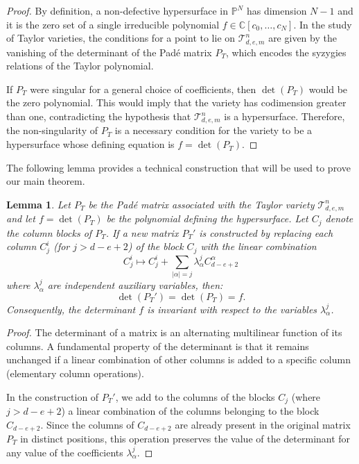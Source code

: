 \documentclass[letterpaper,11pt]{amsart}
\theoremstyle{plain}
\newtheorem{lemma}[theorem]{Lemma}
\theoremstyle{definition}
\begin{document}
\begin{proof}
By definition, a non-defective hypersurface in $\mathbb{P}^N$ has dimension $N-1$ and it is the zero set of a single irreducible polynomial $f \in \mathbb{C}[c_0, \dots, c_N]$. In the study of Taylor varieties, the conditions for a point to lie on $\mathcal{T}^{n}_{d,e,m}$ are given by the vanishing of the determinant of the Padé matrix $P_T$, which encodes the syzygies relations of the Taylor polynomial. 

If $P_T$ were singular for a general choice of coefficients, then $\det(P_T)$ would be the zero polynomial. This would imply that the variety has codimension greater than one, contradicting the hypothesis that $\mathcal{T}^{n}_{d,e,m}$ is a hypersurface. Therefore, the non-singularity of $P_T$ is a necessary condition for the variety to be a hypersurface whose defining equation is $f = \det(P_T)$.
\end{proof}

The following lemma provides a technical construction that will be used to prove our main theorem.
\begin{lemma} \label{lem:invariance}
Let $P_T$ be the Padé matrix associated with the Taylor variety $\mathcal{T}^{n}_{d,e,m}$ and let $f = \det(P_T)$ be the polynomial defining the hypersurface. Let $C_j$ denote the column blocks of $P_T$. If a new matrix $P_T'$ is constructed by replacing each column $C_j^i$ (for $j > d-e+2$) of the block $C_j$ with the linear combination
\begin{equation}
    C_j^i \mapsto C_j^i + \sum_{|\alpha|=j} \lambda_{\alpha}^j C_{d-e+2}^\alpha
\end{equation}
    where $\lambda_{\alpha}^j$ are independent auxiliary variables, 
    then:
\begin{equation}
    \det(P_T') = \det(P_T) = f.
\end{equation}
Consequently, the determinant $f$ is invariant with respect to the variables $\lambda_{\alpha}^j$.
\end{lemma}

\begin{proof}
The determinant of a matrix is an alternating multilinear function of its columns. A fundamental property of the determinant is that it remains unchanged if a linear combination of other columns is added to a specific column (elementary column operations).

In the construction of $P_T'$, we add to the columns of the blocks $C_j$ (where $j > d-e+2$) a linear combination of the columns belonging to the block $C_{d-e+2}$. Since the columns of $C_{d-e+2}$ are already present in the original matrix $P_T$ in distinct positions, this operation preserves the value of the determinant for any value of the coefficients $\lambda_{\alpha}^j$. 
\end{proof}
\end{document}
